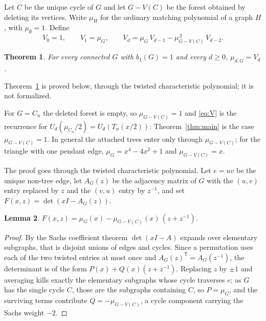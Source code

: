 \documentclass[11pt]{article}
\newtheorem{theorem}{Theorem}
\newtheorem{lemma}[theorem]{Lemma}
\theoremstyle{remark}
\begin{document}
Let $C$ be the unique cycle of $G$ and let $G-V(C)$ be the forest obtained by
deleting its vertices. Write $\mu_H$ for the ordinary matching polynomial of a
graph $H$, with $\mu_\emptyset=1$. Define
\begin{equation}\label{eq:V}
V_0=1,\qquad V_1=\mu_G,\qquad
V_d=\mu_G\,V_{d-1}-\mu_{G-V(C)}^{\,2}\,V_{d-2}.
\end{equation}

\begin{theorem}\label{thm:uni}
For every connected $G$ with $b_1(G)=1$ and every $d\ge0$, $\mu_{d,G}=V_d$.
\end{theorem}

Theorem~\ref{thm:uni} is proved below, through the twisted characteristic polynomial; it is not
formalized.

For $G=C_n$ the deleted forest is empty, so $\mu_{G-V(C)}=1$ and \eqref{eq:V}
is the recurrence for $U_d(\mu_{C_n}/2)=U_d(T_n(x/2))$: Theorem~\ref{thm:main}
is the case $\mu_{G-V(C)}=1$. In general the attached trees enter only through
$\mu_{G-V(C)}$; for the triangle with one pendant edge,
$\mu_G=x^4-4x^2+1$ and $\mu_{G-V(C)}=x$.

The proof goes through the twisted characteristic polynomial. Let $e=uv$ be the
unique non-tree edge, let $A_G(z)$ be the adjacency matrix of $G$ with the
$(u,v)$ entry replaced by $z$ and the $(v,u)$ entry by $z^{-1}$, and set
$F(x,z)=\det(xI-A_G(z))$.

\begin{lemma}\label{lem:PQ}
$F(x,z)=\mu_G(x)-\mu_{G-V(C)}(x)\,(z+z^{-1})$.
\end{lemma}

\begin{proof}
By the Sachs coefficient theorem $\det(xI-A)$ expands over elementary
subgraphs, that is disjoint unions of edges and cycles. Since a permutation
uses each of the two twisted entries at most once and
$A_G(z)^{\mathsf T}=A_G(z^{-1})$, the determinant is of the form
$P(x)+Q(x)(z+z^{-1})$. Replacing $z$ by $\pm1$ and averaging kills exactly the
elementary subgraphs whose cycle traverses $e$; as $G$ has the single cycle $C$,
those are the subgraphs containing $C$, so $P=\mu_G$, and the surviving terms
contribute $Q=-\mu_{G-V(C)}$, a cycle component carrying the Sachs weight $-2$.
\end{proof}
\end{document}
